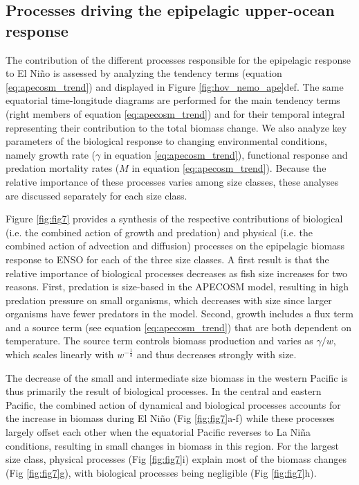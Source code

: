 \subsection{Processes driving the epipelagic upper-ocean response}

The contribution of the different processes responsible for the epipelagic response to El Niño is assessed by analyzing the tendency terms (equation \ref{eq:apecosm_trend}) and displayed in Figure \ref{fig:hov_nemo_ape}def. The same equatorial time-longitude diagrams are performed for the main tendency terms (right members of equation \ref{eq:apecosm_trend}) and for their temporal integral representing their contribution to the total biomass change. We also analyze key parameters of the biological response to changing environmental conditions, namely growth rate ($\gamma$ in equation \ref{eq:apecosm_trend}), functional response and predation mortality rates ($M$ in equation \ref{eq:apecosm_trend}). Because the relative importance of these processes varies among size classes, these analyses are discussed separately for each size class.

Figure \ref{fig:fig7} provides a synthesis of the respective contributions of biological (i.e. the combined action of growth and predation) and physical (i.e. the combined action of advection and diffusion) processes on the epipelagic biomass response to ENSO for each of the three size classes. A first result is that the relative importance of biological processes decreases as fish size increases for two reasons. First, predation is size-based in the APECOSM model, resulting in high predation pressure on small organisms, which decreases with size since larger organisms have fewer predators in the model. Second, growth includes a flux term and a source term (see equation \ref{eq:apecosm_trend}) that are both dependent on temperature. The source term controls biomass production and varies as ${\gamma}/{w}$, which scales linearly with $w^{-\frac{1}{3}}$ and thus decreases strongly with size.

The decrease of the small and intermediate size biomass in the western Pacific is thus primarily the result of biological processes. In the central and eastern Pacific, the combined action of dynamical and biological processes accounts for the increase in biomass during El Niño (Fig \ref{fig:fig7}a-f) while these processes largely offset each other when the equatorial Pacific reverses to La Niña conditions, resulting in small  changes in biomass in this region. For the largest size class, physical processes (Fig \ref{fig:fig7}i) explain most of the biomass changes (Fig \ref{fig:fig7}g), with biological processes being negligible (Fig \ref{fig:fig7}h).

